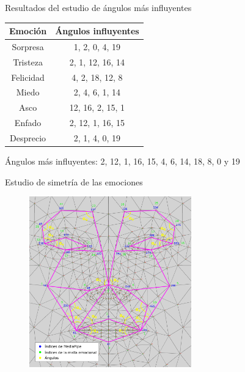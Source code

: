 \documentclass{beamer}
\begin{document}
\begin{frame}{Resultados del estudio de ángulos más influyentes}
\label{diapo:resultados_angulos_influyentes}
\begin{table}[H]
\begin{center}
\begin{tabular}{|c|c|}
     \hline
    \textbf{Emoción} & \textbf{Ángulos influyentes} \\
    \hline
     Sorpresa & 1, 2, 0, 4, 19 \\
     Tristeza & 2, 1, 12, 16, 14 \\
     Felicidad & 4, 2, 18, 12, 8 \\
     Miedo & 2, 4, 6, 1, 14 \\
     Asco & 12, 16, 2, 15, 1 \\
     Enfado & 2, 12, 1, 16, 15 \\
     Desprecio & 2, 1, 4, 0, 19 \\
     \hline
 \end{tabular}
\end{center}
\end{table}
\vspace{0.5cm}
\centering
Ángulos más influyentes: 2, 12, 1, 16, 15, 4, 6, 14, 18, 8, 0 y 19

\end{frame}

\begin{frame}{Estudio de simetría de las emociones}
\begin{figure}[h!]
  \begin{center}
    \includegraphics[width=7cm]{figs/emotional_mesh_2_mitades.png}
  \end{center}
\end{figure}
\end{frame}
\end{document}
